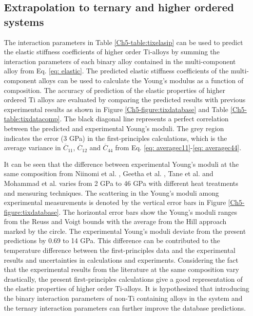 \subsection{Extrapolation to ternary and higher ordered systems}

The interaction parameters in Table \ref{Ch5-table:tixelasip} can be used to predict the elastic stiffness coefficients of higher order Ti-alloys by summing the interaction parameters of each binary alloy contained in the multi-component alloy from Eq. \ref{eq: elastic}. The predicted elastic stiffness coefficients of the multi-component alloys can be used to calculate the Young's modulus as a function of composition. The accuracy of prediction of the elastic properties of higher ordered Ti alloys are evaluated by comparing the predicted results with previous experimental results \cite{Niinomi2012,Tane2010a,Geetha2009,Mohammed2014} as shown in Figure \ref{Ch5-figure:tixdatabase} and Table \ref{Ch5-table:tixdatacomp}. The black diagonal line represents a perfect correlation between the predicted and experimental Young's moduli. The grey region indicates the error (3 GPa) in the first-principles calculations, which is the average variance in $\overline{C}_{11}$, $\overline{C}_{12}$ and $\overline{C}_{44}$ from Eq. \ref{eq: averagec11}-\ref{eq: averagec44}. 

It can be seen that the difference between experimental Young's moduli at the same composition from Niinomi et al. \cite{Niinomi2012}, Geetha et al. \cite{Geetha2009}, Tane et al. \cite{Tane2010a} and Mohammad et al. \cite{Mohammed2014} varies from 2 GPa to 46 GPa with different heat treatments and measuring techniques. The scattering in the Young's moduli among experimental measurements is denoted by the vertical error bars in Figure \ref{Ch5-figure:tixdatabase}. The horizontal error bars show the Young's moduli ranges from the Reuss and Voigt bounds with the average from the Hill approach marked by the circle. The experimental Young's moduli deviate from the present predictions by 0.69 to 14 GPa. This difference can be contributed to the temperature difference between the first-principles data and the experimental results and uncertainties in calculations and experiments. Considering the fact that the experimental results from the literature at the same composition vary drastically, the present first-principles calculations give a good representation of the elastic properties of higher order Ti-alloys. It is hypothesized that introducing the binary interaction parameters of non-Ti containing alloys in the system and the ternary interaction parameters can further improve the database predictions. 

